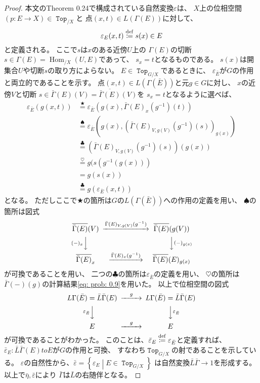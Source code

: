 \documentclass[uplatex]{jsarticle}
\theoremstyle{definition}
\def\ep{\varepsilon}
\DeclareMathOperator{\Hom}{Hom}
\newcommand{\dfn}{\overset{\mathrm{\tiny def}}{\coloneqq}}
\DeclareMathOperator{\sfTop}{\mathtt{Top}}
\begin{document}
\begin{proof}
  本文のTheorem 0.24で構成されている自然変換\(\ep\)は、
  \(X\)上の位相空間\((p:E\to X)\in \sfTop_{/X}\)と
  点\((x,t)\in L(\Gamma(E))\)に対して、
  \[
  \ep_{E}(x,t) \dfn s(x)\in E
  \]
  と定義される。
  ここで\(s\)は\(x\)のある近傍\(U\)上の
  \(\Gamma(E)\)の切断\(s\in \Gamma(E) = \Hom_{/X}(U,E)\)であって、
  \(s_x = t\)となるものである。
  \(s(x)\)は開集合\(U\)や切断\(s\)の取り方によらない。
  \(E\in \sfTop_{G/X}\)であるときに、
  \(\ep_{\bar{E}}\)が\(G\)の作用と両立的であることを示す。
  点\((x,t)\in L(\Gamma(\bar{E}))\)と元\(g\in G\)に対し、
  \(x\)の近傍\(V\)と切断
  \(s\in \bar{\Gamma}(E)(V) = \overline{\bar{\Gamma}(E)}(V)\)を
  \(s_x = t\)となるように選べば、
  \begin{align*}
    \ep_{\bar{E}}(g(x,t))
    &\overset{\bigstar}{=}
    \ep_{\bar{E}}(g(x),\bar{\Gamma}(E)_x(g^{-1})(t)) \\
    &\overset{\spadesuit}{=}
    \ep_{\bar{E}}(g(x), \left( \bar{\Gamma}(E)_{V,g(V)}(g^{-1})(s)\right)_{g(x)}) \\
    &\overset{\clubsuit}{=}
    \left( \bar{\Gamma}(E)_{V,g(V)}(g^{-1})(s)\right) (g(x)) \\
    &\overset{\heartsuit}{=}
    g(s(g^{-1}(g(x))) \\
    &= g(s(x)) \\
    &\overset{\clubsuit}{=} g(\ep_{\bar{E}}(x,t))
  \end{align*}
  となる。
  ただしここで\(\bigstar\)の箇所は\(G\)の\(L(\Gamma(\bar{E}))\)への作用の定義を用い、
  \(\spadesuit\)の箇所は図式
  \[
  \begin{CD}
    \overline{\bar{\Gamma}(E)}(V) @>\bar{\Gamma}(E)_{V,g(V)}(g^{-1})>>
    \overline{\bar{\Gamma}(E)}(g(V)) \\
    @V(-)_xVV @VV(-)_{g(x)}V \\
    \overline{\bar{\Gamma}(E)}_x @>\bar{\Gamma}(E)_x(g^{-1})>>
    \overline{\bar{\Gamma}(E)}(E)_{g(x)}
  \end{CD}
  \]
  が可換であることを用い、
  二つの\(\clubsuit\)の箇所は\(\ep_{\bar{E}}\)の定義を用い、
  \(\heartsuit\)の箇所は\(\bar{\Gamma}(-)(g)\)の計算結果\eqref{eq: prob: 0.9}を用いた。
  以上で位相空間の図式
  \[
  \begin{CD}
    L\Gamma(\bar{E}) = \bar{L}\bar{\Gamma}(E) @>g>> L\Gamma(\bar{E}) = \bar{L}\bar{\Gamma}(E) \\
    @V\ep_{\bar{E}}VV @VV\ep_{\bar{E}}V \\
    E @>g>> E
  \end{CD}
  \]
  が可換であることがわかった。
  このことは、\(\bar{\ep}_E \dfn \ep_{\bar{E}}\)と定義すれば、
  \(\bar{\ep}_E : \bar{L}\bar{\Gamma}(E) to E\)が\(G\)の作用と可換、
  すなわち\(\sfTop_{G/X}\)の射であることを示している。
  \(\ep\)の自然性から、\(\bar{\ep} = \left\{ \ep_E \middle| E\in \sfTop_{G/X}\right\}\)
  は自然変換\(\bar{L}\bar{\Gamma}\to 1\)を形成する。
  以上で\(\bar{\eta},\bar{\ep}\)により
  \(\bar{\Gamma}\)は\(\bar{L}\)の右随伴となる。


\end{proof}
\end{document}
